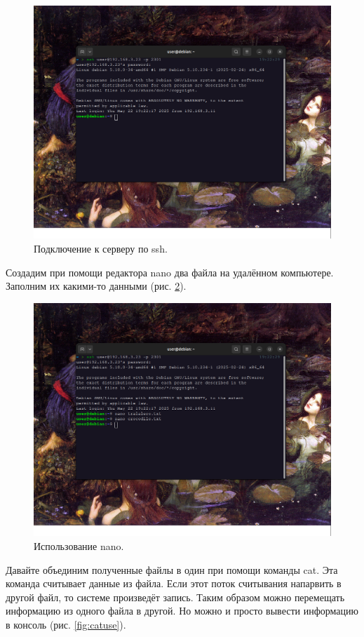 \begin{figure}[h!]
    \centering
    \includegraphics[width=0.8\linewidth]{Pic/lab5/Снимок экрана от 2025-05-22 19-22-39.png}
    \caption{Подключение к серверу по ssh.}
    \label{fig:sshcon}
\end{figure}

Создадим при помощи редактора nano два файла на удалённом компьютере. Заполним их какими-то данными (рис. \ref{fig:nano}). 

\begin{figure}[h!]
    \centering
    \includegraphics[width=0.8\linewidth]{Pic/lab5/Снимок экрана от 2025-05-22 19-24-15.png}
    \caption{Использование nano.}
    \label{fig:nano}
\end{figure}

 Давайте объединим полученные файлы в один при помощи команды cat. Эта команда считывает данные из файла. Если этот поток считывания напарвить в другой файл, то системе произведёт запись. Таким образом можно перемещать информацию из одного файла в другой. Но можно и просто вывести информацию в консоль  (рис. \ref{fig:catuse}).

